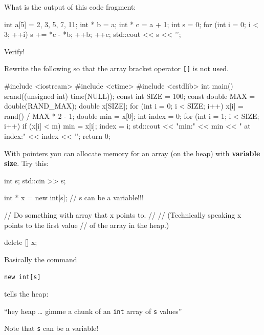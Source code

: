 \begin{ex}
What is the output of this code fragment:

\begin{consolethree}[escapeinside=||]
int a[5] = {2, 3, 5, 7, 11};
int * b = a;
int * c = a + 1;
int s = 0;
for (int i = 0; i < 3; ++i)
{
    s += *c - *b;
    ++b;
    ++c;
}
std::cout << s << '\n';
\end{consolethree}

Verify!
\end{ex}

\begin{ex}
Rewrite the following so that the array bracket
operator \texttt{[]} is not used.

\begin{consolethree}[escapeinside=||]
#include <iostream>
#include <ctime>
#include <cstdlib>
int main()
{
    srand((unsigned int) time(NULL));
    const int SIZE = 100;
    const double MAX = double(RAND_MAX);
    double x[SIZE];
    for (int i = 0; i < SIZE; i++)
    {
        x[i] = rand() / MAX * 2 - 1;
    }
    double min = x[0];
    int index = 0;
    for (int i = 1; i < SIZE; i++)
    {
        if (x[i] < m)
        {
            min = x[i];
            index = i;
        }
    }
    std::cout << "min:" << min
              << " at index:" << index
              << '\n';
    return 0;
}
\end{consolethree}
\end{ex}


\newpage{}

With pointers you can allocate memory for an array (on the heap) with
\textbf{variable size}. Try this:

\begin{consolethree}[escapeinside=||]
int s;
std::cin >> s;

int * x = new int[s]; // s can be a variable!!!

// Do something with array that x points to.
//
// (Technically speaking x points to the first value
// of the array in the heap.)

delete [] x;
\end{consolethree}

Basically the command

\verb!new int[s]!

tells the heap:

``hey heap \ldots{} gimme a chunk of an \texttt{int} array of \texttt{s}
values''

Note that \texttt{s} can be a variable!


